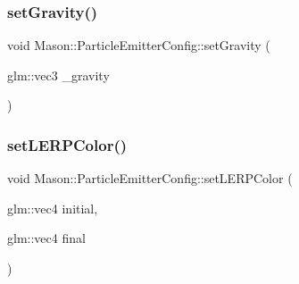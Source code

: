\hypertarget{struct_mason_1_1_particle_emitter_config_ab34a3cc0d4c7252492a261c063b9376b}{}\label{struct_mason_1_1_particle_emitter_config_ab34a3cc0d4c7252492a261c063b9376b} 
\subsubsection{\texorpdfstring{set\+Gravity()}{setGravity()}}
{\footnotesize\ttfamily void Mason\+::\+Particle\+Emitter\+Config\+::set\+Gravity (\begin{DoxyParamCaption}\item[{glm\+::vec3}]{\+\_\+gravity }\end{DoxyParamCaption})\hspace{0.3cm}{\ttfamily [inline]}}

\hypertarget{struct_mason_1_1_particle_emitter_config_a09620b4edcadd022cd8a447da17867a0}{}\label{struct_mason_1_1_particle_emitter_config_a09620b4edcadd022cd8a447da17867a0} 
\subsubsection{\texorpdfstring{set\+L\+E\+R\+P\+Color()}{setLERPColor()}}
{\footnotesize\ttfamily void Mason\+::\+Particle\+Emitter\+Config\+::set\+L\+E\+R\+P\+Color (\begin{DoxyParamCaption}\item[{glm\+::vec4}]{initial,  }\item[{glm\+::vec4}]{final }\end{DoxyParamCaption})\hspace{0.3cm}{\ttfamily [inline]}}

\hypertarget{struct_mason_1_1_particle_emitter_config_ad96c857c3ceac520462a10981e471c4b}{}\label{struct_mason_1_1_particle_emitter_config_ad96c857c3ceac520462a10981e471c4b} 
